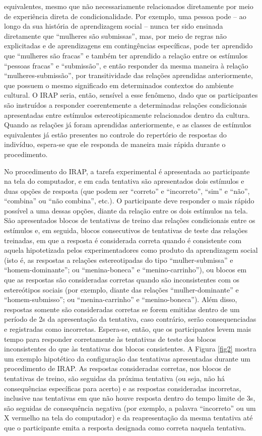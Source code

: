 equivalentes, mesmo que não necessariamente relacionados diretamente por meio de experiência direta de condicionalidade. Por exemplo, uma pessoa pode – ao longo da sua história de aprendizagem social – nunca ter sido ensinada diretamente que ``mulheres são submissas'', mas, por meio de regras não explicitadas e de aprendizagens em contingências específicas, pode ter aprendido que ``mulheres são fracas'' e também ter aprendido a relação entre os estímulos ``pessoas fracas'' e ``submissão'', e então responder da mesma maneira à relação ``mulheres-submissão'', por transitividade das relações aprendidas anteriormente, que possuem o mesmo significado em determinados contextos do ambiente cultural. O IRAP seria, então, sensível a esse fenômeno, dado que os participantes são instruídos a responder coerentemente a determinadas relações condicionais apresentadas entre estímulos estereotipicamente relacionados dentro da cultura. Quando as relações já foram aprendidas anteriormente, e as classes de estímulos equivalentes já estão presentes no controle do repertório de respostas do indivíduo, espera-se que ele responda de maneira mais rápida durante o procedimento.

No procedimento do IRAP, a tarefa experimental é apresentada ao participante na tela do computador, e em cada tentativa são apresentados dois estímulos e duas opções de resposta (que podem ser ``correto'' e ``incorreto'', ``sim'' e ``não'', ``combina'' ou ``não combina'', etc.). O participante deve responder o mais rápido possível a uma dessas opções, diante da relação entre os dois estímulos na tela. São apresentados blocos de tentativas de treino das relações condicionais entre os estímulos e, em seguida, blocos consecutivos de tentativas de teste das relações treinadas, em que a resposta é considerada correta quando é consistente com aquela hipotetizada pelos experimentadores como produto da aprendizagem social (isto é, as respostas a relações estereotipadas do tipo ``mulher-submissa'' e ``homem-dominante''; ou ``menina-boneca'' e ``menino-carrinho''), ou blocos em que as respostas são consideradas corretas quando são inconsistentes com os estereótipos sociais (por exemplo, diante das relações ``mulher-dominante'' e ``homem-submisso''; ou ``menina-carrinho'' e ``menino-boneca''). Além disso, respostas somente são consideradas corretas se forem emitidas dentro de um período de 2s da apresentação da tentativa, caso contrário, serão consequenciadas e registradas como incorretas. Espera-se, então, que os participantes levem mais tempo para responder corretamente às tentativas de teste dos blocos inconsistentes do que às tentativas dos blocos consistentes. A Figura \ref{fig2} mostra um exemplo hipotético da configuração das tentativas apresentadas durante um procedimento de IRAP. As respostas consideradas corretas, nos blocos de tentativas de treino, são seguidas da próxima tentativa (ou seja, não há consequências específicas para acerto) e as respostas consideradas incorretas, inclusive nas tentativas em que não houve resposta dentro do tempo limite de 3s, são seguidas de consequência negativa (por exemplo, a palavra ``incorreto'' ou um X vermelho na tela do computador) e da reapresentação da mesma tentativa até que o participante emita a resposta designada como correta naquela tentativa. 

